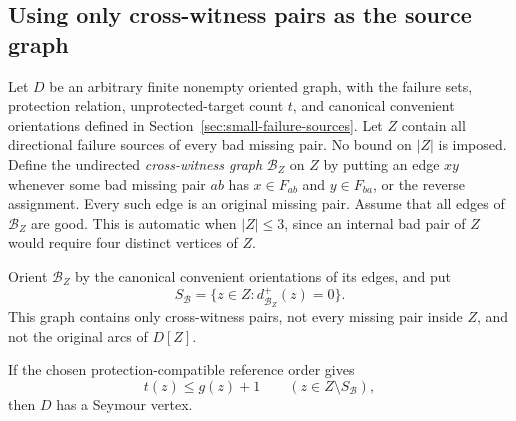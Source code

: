 \subsection{Using only cross-witness pairs as the source graph}
\label{sec:witness-graph-refinement}

Let $D$ be an arbitrary finite nonempty oriented graph, with the
failure sets, protection relation, unprotected-target count $t$, and
canonical convenient orientations defined in
Section~\ref{sec:small-failure-sources}. Let $Z$ contain all directional
failure sources of every bad missing pair. No bound on $|Z|$ is imposed.
Define the undirected \emph{cross-witness graph} $\mathcal B_Z$ on $Z$
by putting an edge $xy$ whenever some bad missing pair $ab$ has
$x\in F_{ab}$ and $y\in F_{ba}$, or the reverse assignment.
Every such edge is an original missing pair. Assume that all edges
of $\mathcal B_Z$ are good. This is automatic when $|Z|\le3$, since
an internal bad pair of $Z$ would require four distinct vertices of $Z$.

Orient $\mathcal B_Z$ by the canonical convenient orientations of
its edges, and put
\[
 S_{\mathcal B}=\{z\in Z:d^+_{\mathcal B_Z}(z)=0\}.
\]
This graph contains only cross-witness pairs, not every missing pair
inside $Z$, and not the original arcs of $D[Z]$.

\begin{lemma}
\label{lem:cross-witness-source-transfer}
If the chosen protection-compatible reference order gives
\[
 t(z)\le g(z)+1\qquad(z\in Z\setminus S_{\mathcal B}),
\]
then $D$ has a Seymour vertex.
\end{lemma}

